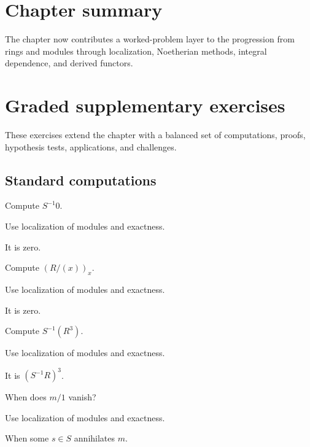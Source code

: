 \section*{Chapter summary}
The chapter now contributes a worked-problem layer to the progression from rings and modules through localization, Noetherian methods, integral dependence, and derived functors.
\section{Graded supplementary exercises}
These exercises extend the chapter with a balanced set of computations, proofs, hypothesis tests, applications, and challenges.

\subsection*{Standard computations}

\begin{exercise}\label{exr:v07-expand-01}
Compute $S^{-1}0$.
\end{exercise}
\begin{hint}
Use localization of modules and exactness.
\end{hint}
\begin{solution}
It is zero.
\end{solution}

\begin{exercise}\label{exr:v07-expand-02}
Compute $(R/(x))_x$.
\end{exercise}
\begin{hint}
Use localization of modules and exactness.
\end{hint}
\begin{solution}
It is zero.
\end{solution}

\begin{exercise}\label{exr:v07-expand-03}
Compute $S^{-1}(R^3)$.
\end{exercise}
\begin{hint}
Use localization of modules and exactness.
\end{hint}
\begin{solution}
It is $(S^{-1}R)^3$.
\end{solution}

\begin{exercise}\label{exr:v07-expand-04}
When does $m/1$ vanish?
\end{exercise}
\begin{hint}
Use localization of modules and exactness.
\end{hint}
\begin{solution}
When some $s\in S$ annihilates $m$.
\end{solution}

